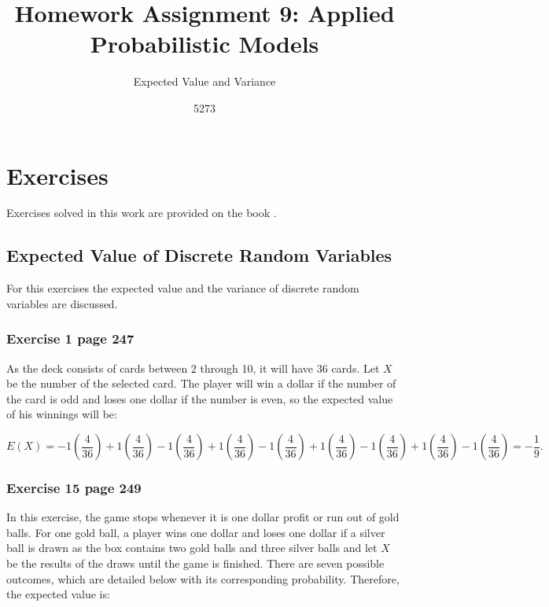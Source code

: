 \documentclass[10pt,leter,openany]{article}
\author{5273}
\title{Homework Assignment 9: Applied Probabilistic Models}
\subtitle{Expected Value and Variance}
\date{}
\begin{document}
	
\maketitle

\section{Exercises}
	
	Exercises solved in this work are provided on the book \citet{grinstead2012introduction}. 
	
	\subsection{Expected Value of Discrete Random Variables}
	
	For this exercises the expected value and the variance of discrete random variables are discussed.
	
	\subsubsection*{Exercise 1 page 247}
	
	As the deck consists of cards between 2 through 10, it will have 36 cards. Let $ X $ be the number of the selected card. The player will win a dollar if the number of the card is odd and loses one dollar if the number is even, so the expected value of his winnings will be:
	
	\begin{equation*}
		E(X) = -1\left( \dfrac{4}{36}\right)  + 1\left( \dfrac{4}{36}\right)  - 1\left( \dfrac{4}{36}\right) + 1\left( \dfrac{4}{36}\right) - 1\left( \dfrac{4}{36}\right) + 1\left( \dfrac{4}{36}\right) - 1\left( \dfrac{4}{36}\right) + 1\left( \dfrac{4}{36}\right) - 1\left( \dfrac{4}{36}\right) = -\dfrac{1}{9}.
	\end{equation*}
	
	\subsubsection*{Exercise 15 page 249}
	
	In this exercise, the game stops whenever it is one dollar profit or run out of gold balls.  For one gold ball, a player wins one dollar and loses one dollar if a silver ball is drawn as the box contains two gold balls and three silver balls and let $ X $ be the results of the draws until the game is finished. There are seven possible outcomes, which are detailed below with its corresponding probability. Therefore, the expected value is:
	
\end{document}
